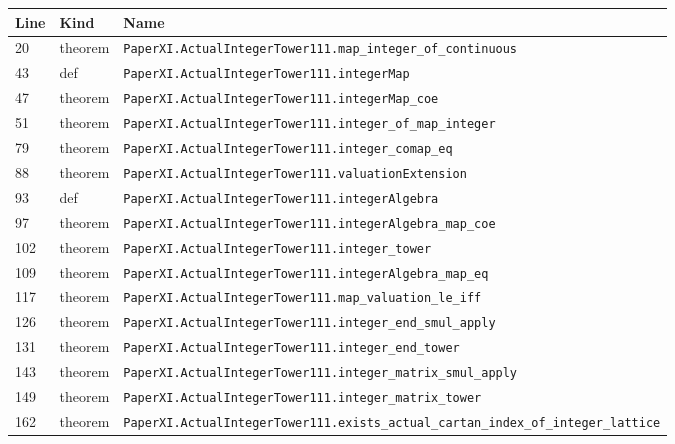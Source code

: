 \documentclass[10pt,oneside]{book}
\begin{document}
\begin{longtable}{@{}p{}p{}p{}@{}}\toprule Line&Kind&Name\\\midrule\endhead

20&theorem&\nolinkurl{PaperXI.ActualIntegerTower111.map_integer_of_continuous}\\

43&def&\nolinkurl{PaperXI.ActualIntegerTower111.integerMap}\\

47&theorem&\nolinkurl{PaperXI.ActualIntegerTower111.integerMap_coe}\\

51&theorem&\nolinkurl{PaperXI.ActualIntegerTower111.integer_of_map_integer}\\

79&theorem&\nolinkurl{PaperXI.ActualIntegerTower111.integer_comap_eq}\\

88&theorem&\nolinkurl{PaperXI.ActualIntegerTower111.valuationExtension}\\

93&def&\nolinkurl{PaperXI.ActualIntegerTower111.integerAlgebra}\\

97&theorem&\nolinkurl{PaperXI.ActualIntegerTower111.integerAlgebra_map_coe}\\

102&theorem&\nolinkurl{PaperXI.ActualIntegerTower111.integer_tower}\\

109&theorem&\nolinkurl{PaperXI.ActualIntegerTower111.integerAlgebra_map_eq}\\

117&theorem&\nolinkurl{PaperXI.ActualIntegerTower111.map_valuation_le_iff}\\

126&theorem&\nolinkurl{PaperXI.ActualIntegerTower111.integer_end_smul_apply}\\

131&theorem&\nolinkurl{PaperXI.ActualIntegerTower111.integer_end_tower}\\

143&theorem&\nolinkurl{PaperXI.ActualIntegerTower111.integer_matrix_smul_apply}\\

149&theorem&\nolinkurl{PaperXI.ActualIntegerTower111.integer_matrix_tower}\\

162&theorem&\nolinkurl{PaperXI.ActualIntegerTower111.exists_actual_cartan_index_of_integer_lattice}\\

\bottomrule\end{longtable}
\end{document}
